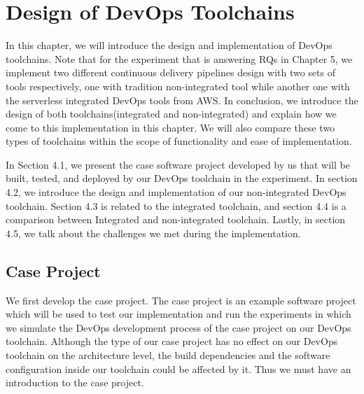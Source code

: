 \chapter{Design of DevOps Toolchains}
In this chapter, we will introduce the design and implementation of DevOps toolchains.
Note that for the experiment that is answering RQs in Chapter 5, we implement two different continuous delivery pipelines design with two sets of tools respectively, one with tradition non-integrated tool while another one with the serverless integrated DevOps tools from AWS. In conclusion, we introduce the design of both toolchains(integrated and non-integrated) and explain how we come to this implementation in this chapter.
We will also compare these two types of toolchains within the scope of functionality and ease of implementation.
\par
In Section 4.1, we present the case software project developed by us that will be built, tested, and deployed by our DevOps toolchain in the experiment. In section 4.2, we introduce the design and implementation of our non-integrated DevOps toolchain. Section 4.3 is related to the integrated toolchain, and section 4.4 is a comparison between Integrated and non-integrated toolchain. Lastly, in section 4.5, we talk about the challenges we met during the implementation.
\section{Case Project}
We first develop the case project. The case project is an example software project which will be used to test our implementation and run the experiments in which we simulate the DevOps development process of the case project on our DevOps toolchain. Although the type of our case project has no effect on our DevOps toolchain on the architecture level, the build dependencies and the software configuration inside our toolchain could be affected by it. Thus we must have an introduction to the case project.
